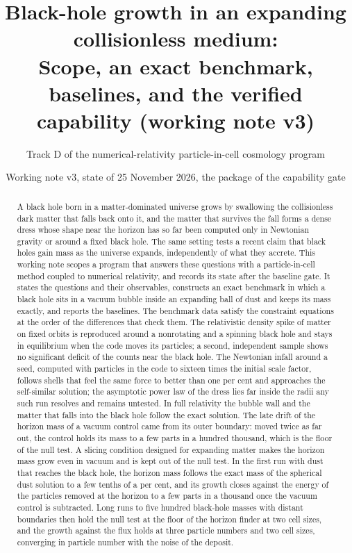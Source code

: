 \documentclass[aps,prd,twocolumn,10pt,superscriptaddress,nofootinbib,longbibliography,floatfix]{revtex4-2}
\begin{document}
\title{Black-hole growth in an expanding collisionless medium:\\ Scope, an exact benchmark, baselines, and the verified capability (working note v3)}

\author{Track D of the numerical-relativity particle-in-cell cosmology program}

\date{Working note v3, state of 25 November 2026, the package of the capability gate}

\begin{abstract}
A black hole born in a matter-dominated universe grows by swallowing the collisionless dark matter that falls back onto it, and the matter that survives the fall forms a dense dress whose shape near the horizon has so far been computed only in Newtonian gravity or around a fixed black hole. The same setting tests a recent claim that black holes gain mass as the universe expands, independently of what they accrete. This working note scopes a program that answers these questions with a particle-in-cell method coupled to numerical relativity, and records its state after the baseline gate. It states the questions and their observables, constructs an exact benchmark in which a black hole sits in a vacuum bubble inside an expanding ball of dust and keeps its mass exactly, and reports the baselines. The benchmark data satisfy the constraint equations at the order of the differences that check them. The relativistic density spike of matter on fixed orbits is reproduced around a nonrotating and a spinning black hole and stays in equilibrium when the code moves its particles; a second, independent sample shows no significant deficit of the counts near the black hole. The Newtonian infall around a seed, computed with particles in the code to sixteen times the initial scale factor, follows shells that feel the same force to better than one per cent and approaches the self-similar solution; the asymptotic power law of the dress lies far inside the radii any such run resolves and remains untested. In full relativity the bubble wall and the matter that falls into the black hole follow the exact solution. The late drift of the horizon mass of a vacuum control came from its outer boundary: moved twice as far out, the control holds its mass to a few parts in a hundred thousand, which is the floor of the null test. A slicing condition designed for expanding matter makes the horizon mass grow even in vacuum and is kept out of the null test. In the first run with dust that reaches the black hole, the horizon mass follows the exact mass of the spherical dust solution to a few tenths of a per cent, and its growth closes against the energy of the particles removed at the horizon to a few parts in a thousand once the vacuum control is subtracted. Long runs to five hundred black-hole masses with distant boundaries then hold the null test at the floor of the horizon finder at two cell sizes, and the growth against the flux holds at three particle numbers and two cell sizes, converging in particle number with the noise of the deposit.
\end{abstract}
\end{document}
